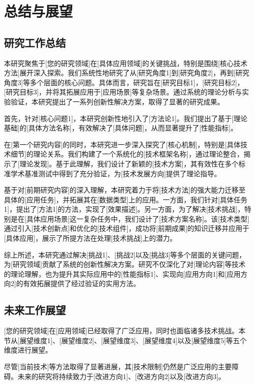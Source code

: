 \chapter{总结与展望}

\section{研究工作总结}

本研究聚焦于[您的研究领域]在[具体应用领域]的关键挑战，特别是围绕[核心技术方法]展开深入探索。我们系统性地研究了从[研究角度1]到[研究角度2]，再到[研究角度3]等多个层面的核心问题。具体而言，研究旨在[研究目标1]，[研究目标2]，[研究目标3]，并将其拓展应用于[应用场景]等复杂场景。通过系统的理论分析与实验验证，本研究提出了一系列创新性解决方案，取得了显著的研究成果。

首先，针对[核心问题1]，本研究创新性地引入了[方法论1]。我们提出了基于[理论基础]的[具体方法名称]，有效解决了[具体问题]，从而显著提升了[性能指标]。

在[第一个研究内容]的同时，本研究进一步深入探究了[核心机制]，特别是[具体技术细节]的理论关系。我们构建了一个系统化的[技术框架名称]，通过理论整合，揭示了[理论发现]。基于此理解，我们设计了新颖的[技术方案]，其有效性在多个标准学术基准测试中得到了充分验证，为[技术发展方向]提供了理论指导。

基于对[前期研究内容]的深入理解，本研究着力于将[技术方法]的强大能力迁移至具体的[应用任务]，并拓展其在[数据类型]上的应用。一方面，我们针对[具体任务1]，提出了[方法1]的方法，实现了[效果描述]。另一方面，为了解决[技术挑战]，特别是在[具体应用场景]这一复杂任务中，我们设计了[技术方案名称]。该[技术类型]通过引入[技术创新点]和优化的[技术组件]，成功将[前期成果]的知识迁移并应用于[具体应用]，展示了所提方法在处理[技术挑战]上的潜力。

综上所述，本研究通过解决[挑战1]、[挑战2]以及[挑战3]等多个层面的关键问题，为[研究领域]贡献了系统的创新性解决方案。研究不仅深化了对[理论内容]等技术的理论理解，也为提升其实际应用中的[性能指标1]、实现向[应用方向1]和[应用方向2]的有效拓展提供了经过验证的实用方法。

\section{未来工作展望}

[您的研究领域]在[应用领域]已经取得了广泛应用，同时也面临诸多技术挑战。本节从[展望维度1]、[展望维度2]、[展望维度3]、[展望维度4]以及[展望维度5]等五个维度进行展望。

{\heiti [展望方向1]}
尽管[当前技术]等方法取得了显著进展，其[技术限制]仍然是广泛应用的主要障碍。未来的研究将持续致力于[改进方向1]、[改进方向2]以及[改进方向3]。

